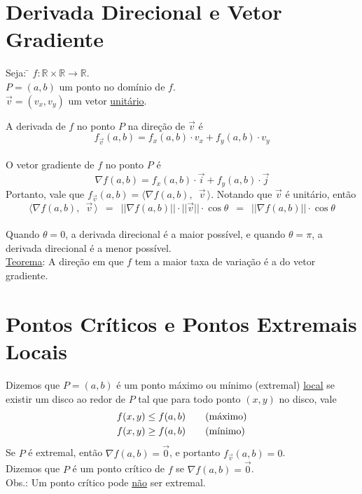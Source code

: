 \documentclass{article}
\begin{document}
\section{Derivada Direcional e Vetor Gradiente}
\begin{tabbing}
Seja: \= $f : \mathbb{R} \times \mathbb{R} \rightarrow \mathbb{R}$. \\[5pt]
  \> $P = (a, b)$ um ponto no domínio de $f$. \\[5pt]
  \> $\vec{v} = (v_x, v_y)$ um vetor \uline{unitário}.
\end{tabbing}
\vspace{10pt}
A derivada de $f$ no ponto $P$ na direção de $\vec{v}$ é
\[ f_{\vec{v}}(a,b) = f_x(a,b) \cdot v_x + f_y(a,b) \cdot v_y \] \\
O vetor gradiente de $f$ no ponto $P$ é
\[ \nabla f(a,b) = f_x(a,b) \cdot \vec{i} + f_y(a,b) \cdot \vec{j} \]
Portanto, vale que $f_{\vec{v}}(a,b) = \langle \nabla f(a,b), \enspace \vec{v} \, \rangle$. Notando que $\vec{v}$ é unitário, então
\[ \langle \nabla f(a,b), \enspace \vec{v} \, \rangle \enspace = \enspace  ||\nabla f(a,b)|| \cdot  ||\vec{v}|| \cdot \cos \theta \enspace = \enspace  ||\nabla f(a,b)|| \cdot \cos \theta \] \\
Quando $\theta = 0$, a derivada direcional é a maior possível, e quando $\theta = \pi$, a derivada direcional é a menor possível. \\[20pt]
\uline{Teorema}: A direção em que $f$ tem a maior taxa de variação é a do vetor gradiente.



\section{Pontos Críticos e Pontos Extremais Locais}
Dizemos que $P = (a,b)$ é um ponto máximo ou mínimo (extremal) \uline{local} se existir um disco ao redor de $P$ tal que para todo ponto $(x,y)$ no disco, vale
\begin{align*}
  f(x,y) \leq f(a,b) & \text{\qquad(máximo)} \\
  f(x,y) \geq f(a,b) & \text{\qquad(mínimo)}
\end{align*}
Se $P$ é extremal, então $\nabla f(a,b) = \vec{0}$, e portanto $f_{\vec{v}}(a,b) = 0$. \\[10pt]
Dizemos que $P$ é um ponto crítico de $f$ se $\nabla f(a,b) = \vec{0}$. \\[10pt]
Obs.: Um ponto crítico pode \uline{não} ser extremal.
\end{document}
